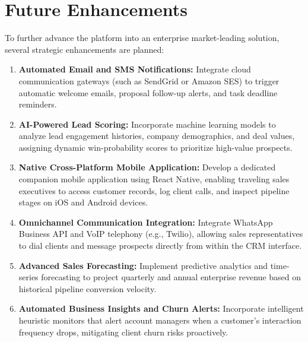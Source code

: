 \section{Future Enhancements}
To further advance the platform into an enterprise market-leading solution, several strategic enhancements are planned:
\begin{enumerate}[label=(\alph*)]
    \item \textbf{Automated Email and SMS Notifications:} Integrate cloud communication gateways (such as SendGrid or Amazon SES) to trigger automatic welcome emails, proposal follow-up alerts, and task deadline reminders.
    \item \textbf{AI-Powered Lead Scoring:} Incorporate machine learning models to analyze lead engagement histories, company demographics, and deal values, assigning dynamic win-probability scores to prioritize high-value prospects.
    \item \textbf{Native Cross-Platform Mobile Application:} Develop a dedicated companion mobile application using React Native, enabling traveling sales executives to access customer records, log client calls, and inspect pipeline stages on iOS and Android devices.
    \item \textbf{Omnichannel Communication Integration:} Integrate WhatsApp Business API and VoIP telephony (e.g., Twilio), allowing sales representatives to dial clients and message prospects directly from within the CRM interface.
    \item \textbf{Advanced Sales Forecasting:} Implement predictive analytics and time-series forecasting to project quarterly and annual enterprise revenue based on historical pipeline conversion velocity.
    \item \textbf{Automated Business Insights and Churn Alerts:} Incorporate intelligent heuristic monitors that alert account managers when a customer's interaction frequency drops, mitigating client churn risks proactively.
\end{enumerate}
